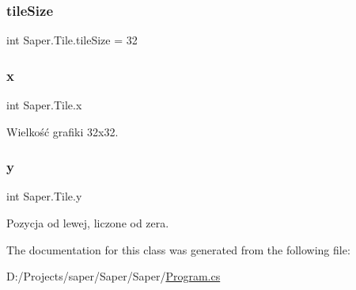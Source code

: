 \subsubsection{\texorpdfstring{tileSize}{tileSize}}
{\footnotesize\ttfamily int Saper.\+Tile.\+tile\+Size = 32}

\mbox{\label{class_saper_1_1_tile_a8861f08f0232b9e06b35f9539f97614e}} 
\subsubsection{\texorpdfstring{x}{x}}
{\footnotesize\ttfamily int Saper.\+Tile.\+x}



Wielkość grafiki 32x32. 

\mbox{\label{class_saper_1_1_tile_a4bee1eb877052349f14938b9d28eea87}} 
\subsubsection{\texorpdfstring{y}{y}}
{\footnotesize\ttfamily int Saper.\+Tile.\+y}



Pozycja od lewej, liczone od zera. 



The documentation for this class was generated from the following file\+:\begin{DoxyCompactItemize}
\item 
D\+:/\+Projects/saper/\+Saper/\+Saper/\mbox{\hyperlink{_program_8cs}{Program.\+cs}}\end{DoxyCompactItemize}
